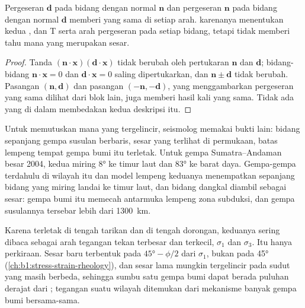 \begin{proposition}\label{prop:b1:earthquake-source:auxiliary}
Pergeseran $\mathbf d$ pada bidang dengan normal $\mathbf n$ dan pergeseran $\mathbf n$ pada bidang dengan normal $\mathbf d$ memberi  yang sama di setiap arah.  karenanya menentukan kedua ,  dan T serta arah pergeseran pada setiap bidang, tetapi tidak memberi tahu  mana yang merupakan sesar.
\end{proposition}

\begin{proof}
Tanda $(\mathbf n\cdot\mathbf x)(\mathbf d\cdot\mathbf x)$ tidak berubah oleh pertukaran $\mathbf n$ dan $\mathbf d$; bidang-bidang $\mathbf n\cdot\mathbf x = 0$ dan $\mathbf d\cdot\mathbf x = 0$ saling dipertukarkan,
dan $\mathbf n \pm \mathbf d$ tidak berubah. Pasangan $(\mathbf n, \mathbf d)$ dan
pasangan $(-\mathbf n, -\mathbf d)$, yang menggambarkan pergeseran yang sama dilihat dari blok lain, juga memberi hasil kali yang sama. Tidak ada yang di dalam  membedakan kedua deskripsi itu.
\end{proof}

Untuk memutuskan  mana yang tergelincir, seismolog memakai bukti lain: bidang sepanjang gempa susulan berbaris, sesar yang terlihat di permukaan, batas lempeng tempat gempa bumi itu terletak. Untuk gempa Sumatra--Andaman besar 2004, kedua  miring \ang{8} ke timur laut dan \ang{83} ke barat daya. Gempa-gempa terdahulu di wilayah itu dan model lempeng keduanya menempatkan  sepanjang bidang yang miring landai ke timur laut, dan bidang dangkal diambil sebagai sesar: gempa bumi itu memecah antarmuka lempeng zona subduksi, dan gempa susulannya tersebar lebih dari \qty{1300}{km}.

Karena  terletak di tengah tarikan dan  di tengah dorongan, keduanya sering dibaca sebagai arah tegangan tekan terbesar dan terkecil, $\sigma_1$ dan $\sigma_3$. Itu hanya perkiraan. Sesar baru terbentuk pada $\ang{45} - \phi/2$ dari $\sigma_1$, bukan pada \ang{45} (\cref{ch:b1:stress-strain-rheology}), dan sesar lama mungkin tergelincir pada sudut yang masih berbeda, sehingga sumbu satu gempa bumi dapat berada puluhan derajat dari ; tegangan suatu wilayah ditemukan dari mekanisme banyak gempa bumi bersama-sama.

